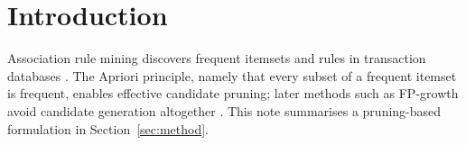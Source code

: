\section{Introduction}
Association rule mining discovers frequent itemsets and rules in transaction
databases \cite{Agrawal1994}. The Apriori principle, namely that every subset of a
frequent itemset is frequent, enables effective candidate pruning; later methods
such as FP-growth avoid candidate generation altogether \cite{Han2000}. This note
summarises a pruning-based formulation in Section~\ref{sec:method}.
